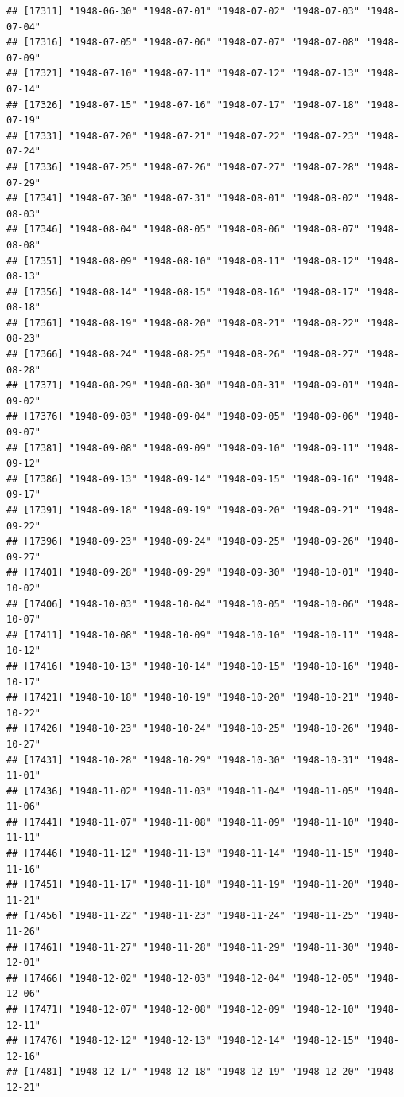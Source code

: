 \documentclass{article}\usepackage[]{graphicx}\usepackage[]{color}
\makeatletter
\newenvironment{kframe}{%
 \def\at@end@of@kframe{}%
 \ifinner\ifhmode%
  \def\at@end@of@kframe{\end{minipage}}%
  \begin{minipage}{\columnwidth}%
 \fi\fi%
 \def\FrameCommand##1{\hskip\@totalleftmargin \hskip-\fboxsep
 \colorbox{shadecolor}{##1}\hskip-\fboxsep
     \hskip-\linewidth \hskip-\@totalleftmargin \hskip\columnwidth}%
 \MakeFramed {\advance\hsize-\width
   \@totalleftmargin\z@ \linewidth\hsize
   \@setminipage}}%
 {\par\unskip\endMakeFramed%
 \at@end@of@kframe}
\newenvironment{knitrout}{}{} %
\makeatother
\begin{document}
\begin{description}
\begin{knitrout}
\begin{kframe}
\begin{verbatim}
## [17311] "1948-06-30" "1948-07-01" "1948-07-02" "1948-07-03" "1948-07-04"
## [17316] "1948-07-05" "1948-07-06" "1948-07-07" "1948-07-08" "1948-07-09"
## [17321] "1948-07-10" "1948-07-11" "1948-07-12" "1948-07-13" "1948-07-14"
## [17326] "1948-07-15" "1948-07-16" "1948-07-17" "1948-07-18" "1948-07-19"
## [17331] "1948-07-20" "1948-07-21" "1948-07-22" "1948-07-23" "1948-07-24"
## [17336] "1948-07-25" "1948-07-26" "1948-07-27" "1948-07-28" "1948-07-29"
## [17341] "1948-07-30" "1948-07-31" "1948-08-01" "1948-08-02" "1948-08-03"
## [17346] "1948-08-04" "1948-08-05" "1948-08-06" "1948-08-07" "1948-08-08"
## [17351] "1948-08-09" "1948-08-10" "1948-08-11" "1948-08-12" "1948-08-13"
## [17356] "1948-08-14" "1948-08-15" "1948-08-16" "1948-08-17" "1948-08-18"
## [17361] "1948-08-19" "1948-08-20" "1948-08-21" "1948-08-22" "1948-08-23"
## [17366] "1948-08-24" "1948-08-25" "1948-08-26" "1948-08-27" "1948-08-28"
## [17371] "1948-08-29" "1948-08-30" "1948-08-31" "1948-09-01" "1948-09-02"
## [17376] "1948-09-03" "1948-09-04" "1948-09-05" "1948-09-06" "1948-09-07"
## [17381] "1948-09-08" "1948-09-09" "1948-09-10" "1948-09-11" "1948-09-12"
## [17386] "1948-09-13" "1948-09-14" "1948-09-15" "1948-09-16" "1948-09-17"
## [17391] "1948-09-18" "1948-09-19" "1948-09-20" "1948-09-21" "1948-09-22"
## [17396] "1948-09-23" "1948-09-24" "1948-09-25" "1948-09-26" "1948-09-27"
## [17401] "1948-09-28" "1948-09-29" "1948-09-30" "1948-10-01" "1948-10-02"
## [17406] "1948-10-03" "1948-10-04" "1948-10-05" "1948-10-06" "1948-10-07"
## [17411] "1948-10-08" "1948-10-09" "1948-10-10" "1948-10-11" "1948-10-12"
## [17416] "1948-10-13" "1948-10-14" "1948-10-15" "1948-10-16" "1948-10-17"
## [17421] "1948-10-18" "1948-10-19" "1948-10-20" "1948-10-21" "1948-10-22"
## [17426] "1948-10-23" "1948-10-24" "1948-10-25" "1948-10-26" "1948-10-27"
## [17431] "1948-10-28" "1948-10-29" "1948-10-30" "1948-10-31" "1948-11-01"
## [17436] "1948-11-02" "1948-11-03" "1948-11-04" "1948-11-05" "1948-11-06"
## [17441] "1948-11-07" "1948-11-08" "1948-11-09" "1948-11-10" "1948-11-11"
## [17446] "1948-11-12" "1948-11-13" "1948-11-14" "1948-11-15" "1948-11-16"
## [17451] "1948-11-17" "1948-11-18" "1948-11-19" "1948-11-20" "1948-11-21"
## [17456] "1948-11-22" "1948-11-23" "1948-11-24" "1948-11-25" "1948-11-26"
## [17461] "1948-11-27" "1948-11-28" "1948-11-29" "1948-11-30" "1948-12-01"
## [17466] "1948-12-02" "1948-12-03" "1948-12-04" "1948-12-05" "1948-12-06"
## [17471] "1948-12-07" "1948-12-08" "1948-12-09" "1948-12-10" "1948-12-11"
## [17476] "1948-12-12" "1948-12-13" "1948-12-14" "1948-12-15" "1948-12-16"
## [17481] "1948-12-17" "1948-12-18" "1948-12-19" "1948-12-20" "1948-12-21"

\end{verbatim}
\end{kframe}
\end{knitrout}
\end{description}
\end{document}
